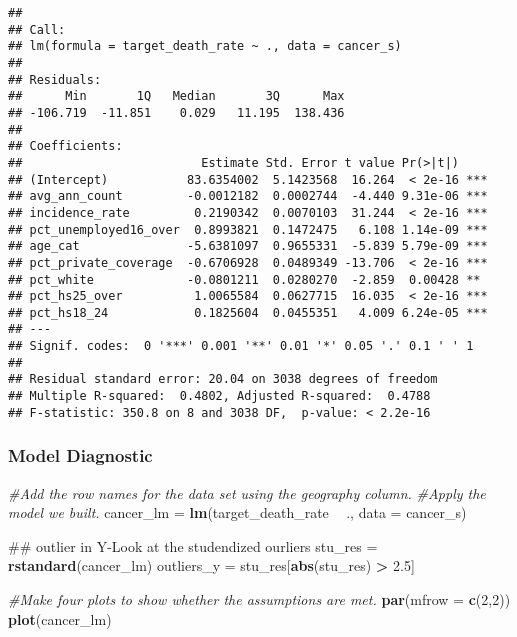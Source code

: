 \documentclass[]{article}
\newenvironment{Shaded}{\begin{snugshade}}{\end{snugshade}}
\newcommand{\KeywordTok}[1]{\textcolor[rgb]{0.13,0.29,0.53}{\textbf{#1}}}
\newcommand{\DataTypeTok}[1]{\textcolor[rgb]{0.13,0.29,0.53}{#1}}
\newcommand{\DecValTok}[1]{\textcolor[rgb]{0.00,0.00,0.81}{#1}}
\newcommand{\FloatTok}[1]{\textcolor[rgb]{0.00,0.00,0.81}{#1}}
\newcommand{\StringTok}[1]{\textcolor[rgb]{0.31,0.60,0.02}{#1}}
\newcommand{\CommentTok}[1]{\textcolor[rgb]{0.56,0.35,0.01}{\textit{#1}}}
\newcommand{\OperatorTok}[1]{\textcolor[rgb]{0.81,0.36,0.00}{\textbf{#1}}}
\newcommand{\NormalTok}[1]{#1}
\begin{document}
\begin{verbatim}
## 
## Call:
## lm(formula = target_death_rate ~ ., data = cancer_s)
## 
## Residuals:
##      Min       1Q   Median       3Q      Max 
## -106.719  -11.851    0.029   11.195  138.436 
## 
## Coefficients:
##                         Estimate Std. Error t value Pr(>|t|)    
## (Intercept)           83.6354002  5.1423568  16.264  < 2e-16 ***
## avg_ann_count         -0.0012182  0.0002744  -4.440 9.31e-06 ***
## incidence_rate         0.2190342  0.0070103  31.244  < 2e-16 ***
## pct_unemployed16_over  0.8993821  0.1472475   6.108 1.14e-09 ***
## age_cat               -5.6381097  0.9655331  -5.839 5.79e-09 ***
## pct_private_coverage  -0.6706928  0.0489349 -13.706  < 2e-16 ***
## pct_white             -0.0801211  0.0280270  -2.859  0.00428 ** 
## pct_hs25_over          1.0065584  0.0627715  16.035  < 2e-16 ***
## pct_hs18_24            0.1825604  0.0455351   4.009 6.24e-05 ***
## ---
## Signif. codes:  0 '***' 0.001 '**' 0.01 '*' 0.05 '.' 0.1 ' ' 1
## 
## Residual standard error: 20.04 on 3038 degrees of freedom
## Multiple R-squared:  0.4802, Adjusted R-squared:  0.4788 
## F-statistic: 350.8 on 8 and 3038 DF,  p-value: < 2.2e-16
\end{verbatim}

\subsubsection{Model Diagnostic}\label{model-diagnostic}

\begin{Shaded}
\begin{Highlighting}[]
\CommentTok{#Add the row names for the data set using the geography column. }
\CommentTok{#Apply the model we built. }
\NormalTok{cancer_lm =}\StringTok{ }\KeywordTok{lm}\NormalTok{(target_death_rate }\OperatorTok{~}\StringTok{ }\NormalTok{., }\DataTypeTok{data =}\NormalTok{ cancer_s)}

\NormalTok{## outlier in Y-Look at the studendized ourliers}
\NormalTok{stu_res =}\StringTok{ }\KeywordTok{rstandard}\NormalTok{(cancer_lm)}
\NormalTok{outliers_y =}\StringTok{ }\NormalTok{stu_res[}\KeywordTok{abs}\NormalTok{(stu_res) }\OperatorTok{>}\StringTok{ }\FloatTok{2.5}\NormalTok{]}

\CommentTok{#Make four plots to show whether the assumptions are met. }
\KeywordTok{par}\NormalTok{(}\DataTypeTok{mfrow =} \KeywordTok{c}\NormalTok{(}\DecValTok{2}\NormalTok{,}\DecValTok{2}\NormalTok{))}
\KeywordTok{plot}\NormalTok{(cancer_lm)}
\end{Highlighting}
\end{Shaded}
\end{document}
